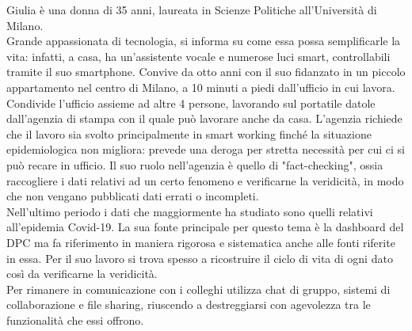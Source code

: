 Giulia è una donna di 35 anni, laureata in Scienze Politiche all'Università di Milano.\\ 
Grande appassionata di tecnologia, si informa su come essa possa semplificarle la vita: infatti, a casa, ha un'assistente vocale e numerose luci smart, controllabili tramite il suo smartphone.
Convive da otto anni con il suo fidanzato in un piccolo appartamento nel centro di Milano, a 10 minuti a piedi dall'ufficio in cui lavora. Condivide l'ufficio assieme ad altre 4 persone, lavorando sul portatile datole dall'agenzia di stampa con il quale può lavorare anche da casa. L'agenzia richiede che il lavoro sia svolto principalmente in smart working finché la situazione epidemiologica non migliora: prevede una deroga per stretta necessità per cui ci si può recare in ufficio.
Il suo ruolo nell'agenzia è quello di "fact-checking", ossia raccogliere i dati relativi ad un certo fenomeno e verificarne la veridicità, in modo che non vengano pubblicati dati errati o incompleti.\\ 
Nell'ultimo periodo i dati che maggiormente ha studiato sono quelli relativi all'epidemia Covid-19. La sua fonte principale per questo tema è la dashboard del DPC ma fa riferimento in maniera rigorosa e sistematica anche alle fonti riferite in essa. Per il suo lavoro si trova spesso a ricostruire il ciclo di vita di ogni dato così da verificarne la veridicità.\\ 
Per rimanere in comunicazione con i colleghi utilizza chat di gruppo, sistemi di collaborazione e file sharing, riuscendo a destreggiarsi con agevolezza tra le funzionalità che essi offrono. 

